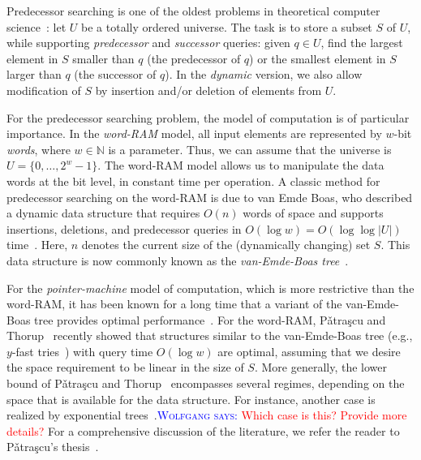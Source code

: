 \documentclass[a4paper,11pt]{article}
\newcommand{\N}{\mathbb{N}}
\newcommand{\?}{\mskip1.5mu}
\newcommand{\Patrascu}{P\v{a}tra\c{s}cu\xspace}
\newcommand{\aremark}[3]{\textcolor{blue}{\textsc{#1 #2:}}
  \textcolor{red}{\textsf{#3}}}
\newcommand{\wolfgang}[2][says]{\aremark{Wolfgang}{#1}{#2}}
\begin{document}
Predecessor searching is one of the oldest problems 
in theoretical computer science~\cite{CormenLeRiSt09,Knuth98}: 
let $U$ be a totally ordered universe. The task is 
to store a subset $S$ of $U$, while supporting 
\emph{predecessor} and \emph{successor} queries: 
given $q \in U$, find the largest element in $S$ 
smaller than $q$ (the predecessor of $q$) or the 
smallest element in $S$ larger than $q$ (the 
successor of $q$). In the \emph{dynamic} version, 
we also allow modification of $S$ by insertion 
and/or deletion of elements from $U$.

For the predecessor searching problem, the model 
of computation is of particular importance. In 
the \emph{word-RAM} model, all input elements 
are represented by $w$-bit \emph{words}, where 
$w \in \N$ is a parameter. Thus, we can assume 
that the universe is $U = \{0, \dots, 2^{w}-1\}$. 
The word-RAM model allows us to 
manipulate the data words at the bit level, 
in constant time per operation. A classic 
method for predecessor searching on the 
word-RAM is due to van Emde Boas, who described 
a dynamic data structure that requires $O(n)$ words
of space and supports insertions, deletions, and 
predecessor queries in 
$O(\log w) = O(\log\log |U|)$ 
time~\cite{vEmdeBoas77,vEmdeBoasKaZi76,CormenLeRiSt09}.
Here, $n$ denotes the current size of the
(dynamically changing) set $S$. This data 
structure is now commonly known as the 
\emph{van-Emde-Boas tree}~\cite{CormenLeRiSt09}.

For the \emph{pointer-machine} model of computation, 
which is more restrictive than the word-RAM, it has 
been known for a long time that a variant of the 
van-Emde-Boas tree provides optimal 
performance~\cite{MehlhornNaAl88,Mulzer09}.
For the word-RAM, \Patrascu and Thorup~\cite{PatrascuTh06,PatrascuTh07} 
recently showed that structures similar to the 
van-Emde-Boas tree (e.g., $y$-fast tries~\cite{Willard83}) 
with query time $O(\log w)$ are optimal, assuming that 
we desire the space requirement to be linear in the 
size of $S$. More generally, the lower bound of 
\Patrascu and Thorup~\cite{PatrascuTh06,PatrascuTh07} 
encompasses several regimes, depending on the 
space that is available for the data structure.
For instance, another case is realized by exponential 
trees~\cite{AnderssonTh07}.\wolfgang{Which case is this?
Provide more details?} 
For a comprehensive discussion of the literature, we refer
the reader to \Patrascu's thesis~\cite{Patrascu08}.
\end{document}
